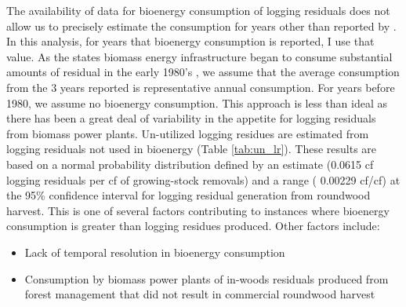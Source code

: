 \documentclass[a4paper,titlepage]{article}
\begin{document}
The availability of data for bioenergy consumption of logging residuals does not allow us to precisely estimate the consumption for years other than reported by \cite{Mciver2012}. In this analysis, for years that bioenergy consumption is reported, I use that value. As the states biomass energy infrastructure began to consume substantial amounts of residual in the early 1980's \citep{Morris2000}, we assume that the average consumption from the 3 years reported is representative annual consumption. For years before 1980, we assume no bioenergy consumption.  This approach is less than ideal as there has been a great deal of variability in the appetite for logging residuals from biomass power plants. Un-utilized logging residues are estimated from logging residuals not used in bioenergy (Table \ref{tab:un_lr}). These results are based on a normal probability distribution defined by an estimate (0.0615 cf logging residuals per cf of growing-stock removals) and a range (\textpm{} 0.00229 cf/cf) at the 95\% confidence interval for logging residual generation from roundwood harvest. This is one of several factors contributing to instances where bioenergy consumption is greater than logging residues  produced. Other factors include:

\begin{itemize}
\item Lack of temporal resolution in bioenergy consumption
\item Consumption by biomass power plants of in-woods residuals produced from forest management that did not result in commercial roundwood harvest
\end{itemize}
\end{document}
